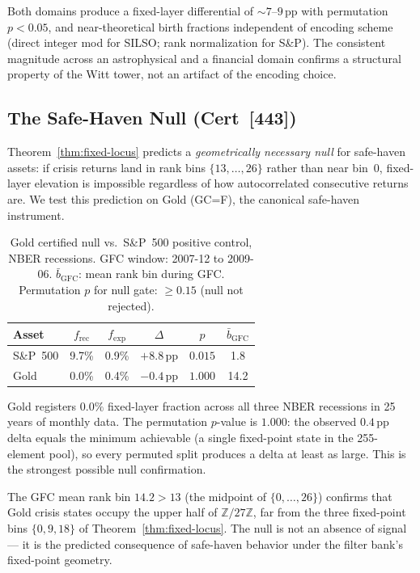 Both domains produce a fixed-layer differential of $\sim7$--$9$\,pp with
permutation $p < 0.05$, and near-theoretical birth fractions independent
of encoding scheme (direct integer mod for SILSO; rank normalization for
S\&P).  The consistent magnitude across an astrophysical and a financial
domain confirms a structural property of the Witt tower, not an artifact
of the encoding choice.

\subsection{The Safe-Haven Null (Cert~[443])}
\label{sec:cert443}

Theorem~\ref{thm:fixed-locus} predicts a \emph{geometrically necessary null}
for safe-haven assets: if crisis returns land in rank bins $\{13,\ldots,26\}$
rather than near bin~$0$, fixed-layer elevation is impossible regardless of
how autocorrelated consecutive returns are.  We test this prediction on Gold
(GC=F), the canonical safe-haven instrument.

\begin{table}[h]
\centering
\caption{Gold certified null vs.\ S\&P~500 positive control, NBER recessions.
  GFC window: 2007-12 to 2009-06.  $\bar{b}_\mathrm{GFC}$: mean rank bin
  during GFC.  Permutation $p$ for null gate: $\geq 0.15$ (null not rejected).}
\label{tab:cert443}
\begin{tabular}{lccccc}
\toprule
Asset & $f_\mathrm{rec}$ & $f_\mathrm{exp}$ & $\Delta$ & $p$ & $\bar{b}_\mathrm{GFC}$ \\
\midrule
S\&P~500 & 9.7\% & 0.9\% & $+8.8$\,pp & $0.015$ & 1.8 \\
Gold     & 0.0\% & 0.4\% & $-0.4$\,pp & $1.000$ & 14.2 \\
\bottomrule
\end{tabular}
\end{table}

Gold registers $0.0\%$ fixed-layer fraction across all three NBER recessions
in 25 years of monthly data.  The permutation $p$-value is $1.000$: the
observed $0.4$\,pp delta equals the minimum achievable (a single fixed-point
state in the 255-element pool), so every permuted split produces a delta at
least as large.  This is the strongest possible null confirmation.

The GFC mean rank bin $14.2 > 13$ (the midpoint of $\{0,\ldots,26\}$)
confirms that Gold crisis states occupy the upper half of $\mathbb{Z}/27\mathbb{Z}$,
far from the three fixed-point bins $\{0, 9, 18\}$ of
Theorem~\ref{thm:fixed-locus}.  The null is not an absence of signal ---
it is the predicted consequence of safe-haven behavior under the filter bank's
fixed-point geometry.

